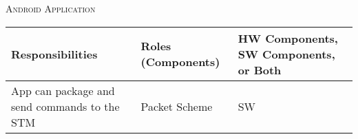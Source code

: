 \documentclass[RRC.tex]{subfiles}
\begin{document}
\bigskip

\begin{center}
	\textsc{\Large Android Application}
	\hrulefill
	\begin{tabular}{ | p{5cm} | p{5cm} | p{5cm} |}
		\hline
		Responsibilities & Roles (Components) & HW Components, SW Components, or Both \\ \hline
		App can package and send commands to the STM & Packet Scheme & SW  \\ \hline
		
	\end{tabular}
\end{center}
\end{document}

